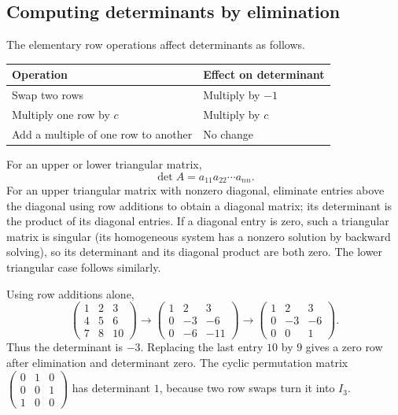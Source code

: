\subsection{Computing determinants by elimination}

The elementary row operations affect determinants as follows.
\begin{center}
\begin{tabular}{ll}
\toprule
Operation & Effect on determinant\\
\midrule
Swap two rows & Multiply by $-1$\\
Multiply one row by $c$ & Multiply by $c$\\
Add a multiple of one row to another & No change\\
\bottomrule
\end{tabular}
\end{center}
For an upper or lower triangular matrix,
\[
 \boxed{\det A=a_{11}a_{22}\cdots a_{nn}.}
\]
For an upper triangular matrix with nonzero diagonal, eliminate entries
above the diagonal using row additions to obtain a diagonal matrix;
its determinant is the product of its diagonal entries.
If a diagonal entry is zero, such a triangular matrix is singular
(its homogeneous system has a nonzero solution by backward solving),
so its determinant and its diagonal product are both zero.
The lower triangular case follows similarly.


\begin{example}
Using row additions alone,
\[
 \begin{pmatrix}1&2&3\\4&5&6\\7&8&10\end{pmatrix}
 \longrightarrow
 \begin{pmatrix}1&2&3\\0&-3&-6\\0&-6&-11\end{pmatrix}
 \longrightarrow
 \begin{pmatrix}1&2&3\\0&-3&-6\\0&0&1\end{pmatrix}.
\]
Thus the determinant is $-3$.
Replacing the last entry $10$ by $9$ gives a zero row after elimination
and determinant zero.
The cyclic permutation matrix
$\begin{pmatrix}0&1&0\\0&0&1\\1&0&0\end{pmatrix}$ has determinant $1$,
because two row swaps turn it into $I_3$.
\end{example}

